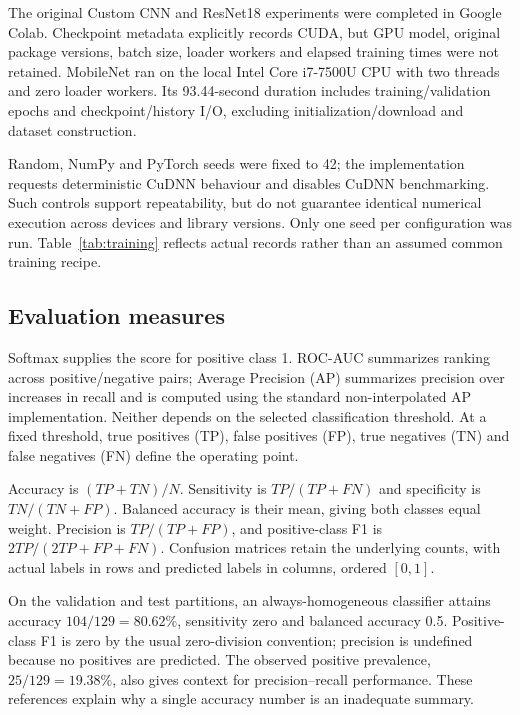 \documentclass[11pt,a4paper]{article}
\begin{document}
The original Custom CNN and ResNet18 experiments were completed in Google Colab. Checkpoint metadata explicitly records CUDA, but GPU model, original package versions, batch size, loader workers and elapsed training times were not retained. MobileNet ran on the local Intel Core i7-7500U CPU with two threads and zero loader workers. Its 93.44-second duration includes training/validation epochs and checkpoint/history I/O, excluding initialization/download and dataset construction.

Random, NumPy and PyTorch seeds were fixed to 42; the implementation requests deterministic CuDNN behaviour and disables CuDNN benchmarking. Such controls support repeatability, but do not guarantee identical numerical execution across devices and library versions. Only one seed per configuration was run. Table~\ref{tab:training} reflects actual records rather than an assumed common training recipe.

\subsection{Evaluation measures}
Softmax supplies the score for positive class 1. ROC-AUC summarizes ranking across positive/negative pairs; Average Precision (AP) summarizes precision over increases in recall and is computed using the standard non-interpolated AP implementation. Neither depends on the selected classification threshold. At a fixed threshold, true positives (TP), false positives (FP), true negatives (TN) and false negatives (FN) define the operating point.

Accuracy is $(TP+TN)/N$. Sensitivity is $TP/(TP+FN)$ and specificity is $TN/(TN+FP)$. Balanced accuracy is their mean, giving both classes equal weight. Precision is $TP/(TP+FP)$, and positive-class F1 is $2TP/(2TP+FP+FN)$. Confusion matrices retain the underlying counts, with actual labels in rows and predicted labels in columns, ordered $[0,1]$.

On the validation and test partitions, an always-homogeneous classifier attains accuracy $104/129=80.62\%$, sensitivity zero and balanced accuracy 0.5. Positive-class F1 is zero by the usual zero-division convention; precision is undefined because no positives are predicted. The observed positive prevalence, $25/129=19.38\%$, also gives context for precision--recall performance. These references explain why a single accuracy number is an inadequate summary.
\end{document}
